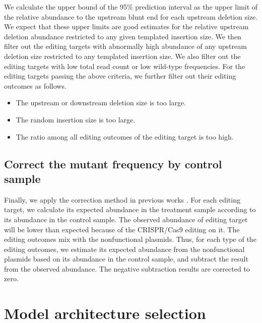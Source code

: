 \documentclass{article}
\begin{document}
We calculate the upper bound of the 95\% prediction interval as the upper limit of the relative abundance to the upstream blunt end for each upstream deletion size. We expect that these upper limits are good estimates for the relative upstream deletion abundance restricted to any given templated insertion size. We then filter out the editing targets with abnormally high abundance of any upstream deletion size restricted to any templated insertion size. We also filter out the editing targets with low total read count or low wild-type frequencies. For the editing targets passing the above criteria, we further filter out their editing outcomes as follows.
\begin{itemize}
  \item The upstream or downstream deletion size is too large.
  \item The random insertion size is too large.
  \item The ratio among all editing outcomes of the editing target is too high.
\end{itemize}

\subsection{Correct the mutant frequency by control sample}

Finally, we apply the correction method in previous works \cite{kim_prediction_2020,kim_high-throughput_2020}. For each editing target, we calculate its expected abundance in the treatment sample according to its abundance in the control sample. The observed abundance of editing target will be lower than expected because of the CRISPR/Cas9 editing on it. The editing outcomes mix with the nonfunctional plasmids. Thus, for each type of the editing outcomes, we estimate its expected abundance from the nonfunctional plasmids based on its abundance in the control sample, and subtract the result from the observed abundance. The negative subtraction results are corrected to zero.

\section{Model architecture selection}
\end{document}
